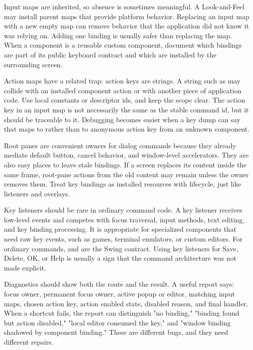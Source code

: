 Input maps are inherited, so absence is sometimes meaningful. A Look-and-Feel
may install parent maps that provide platform behavior. Replacing an input map
with a new empty map can remove behavior that the application did not know it
was relying on. Adding one binding is usually safer than replacing the map.
When a component is a reusable custom component, document which bindings are
part of its public keyboard contract and which are installed by the surrounding
screen.

Action maps have a related trap: action keys are strings. A string such as
 may collide with an installed component action or with another
piece of application code. Use local constants or descriptor ids, and keep the
scope clear. The action key in an input map is not necessarily the same as the
stable command id, but it should be traceable to it. Debugging becomes easier
when a key dump can say that  maps to  rather
than to anonymous action key  from an unknown component.

Root panes are convenient owners for dialog commands because they already
mediate default button, cancel behavior, and window-level accelerators. They
are also easy places to leave stale bindings. If a screen replaces its content
inside the same frame, root-pane actions from the old content may remain unless
the owner removes them. Treat key bindings as installed resources with
lifecycle, just like listeners and overlays.

Key listeners should be rare in ordinary command code. A key listener receives
low-level events and competes with focus traversal, input methods, text editing,
and key binding processing. It is appropriate for specialized components that
need raw key events, such as games, terminal emulators, or custom editors. For
ordinary commands,  and  are the Swing contract.
Using key listeners for Save, Delete, OK, or Help is usually a sign that the
command architecture was not made explicit.

Diagnostics should show both the route and the result. A useful report says:
focus owner, permanent focus owner, active popup or editor, matching input maps,
chosen action key, action enabled state, disabled reason, and final handler.
When a shortcut fails, the report can distinguish "no binding," "binding found
but action disabled," "local editor consumed the key," and "window binding
shadowed by component binding." These are different bugs, and they need
different repairs.

